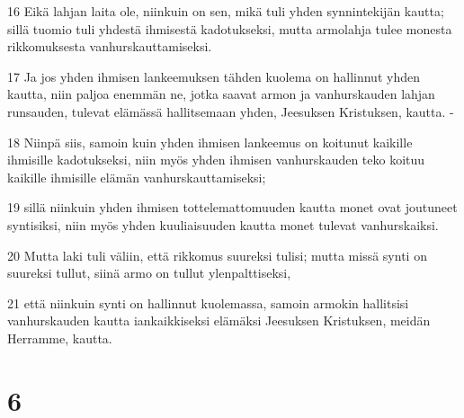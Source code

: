 \par 16 Eikä lahjan laita ole, niinkuin on sen, mikä tuli yhden synnintekijän kautta; sillä tuomio tuli yhdestä ihmisestä kadotukseksi, mutta armolahja tulee monesta rikkomuksesta vanhurskauttamiseksi.
\par 17 Ja jos yhden ihmisen lankeemuksen tähden kuolema on hallinnut yhden kautta, niin paljoa enemmän ne, jotka saavat armon ja vanhurskauden lahjan runsauden, tulevat elämässä hallitsemaan yhden, Jeesuksen Kristuksen, kautta. -
\par 18 Niinpä siis, samoin kuin yhden ihmisen lankeemus on koitunut kaikille ihmisille kadotukseksi, niin myös yhden ihmisen vanhurskauden teko koituu kaikille ihmisille elämän vanhurskauttamiseksi;
\par 19 sillä niinkuin yhden ihmisen tottelemattomuuden kautta monet ovat joutuneet syntisiksi, niin myös yhden kuuliaisuuden kautta monet tulevat vanhurskaiksi.
\par 20 Mutta laki tuli väliin, että rikkomus suureksi tulisi; mutta missä synti on suureksi tullut, siinä armo on tullut ylenpalttiseksi,
\par 21 että niinkuin synti on hallinnut kuolemassa, samoin armokin hallitsisi vanhurskauden kautta iankaikkiseksi elämäksi Jeesuksen Kristuksen, meidän Herramme, kautta.

\chapter{6}

